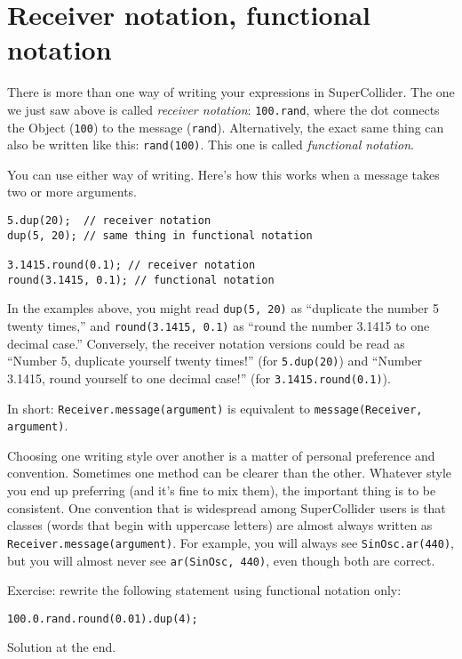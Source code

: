 \section{Receiver notation, functional notation}

There is more than one way of writing your expressions in SuperCollider. The one we just saw above is called \emph{receiver notation}: \texttt{100.rand}, where the dot connects the Object (\texttt{100}) to the message (\texttt{rand}). Alternatively, the exact same thing can also be written like this: \texttt{rand(100)}. This one is called \emph{functional notation}.

You can use either way of writing. Here's how this works when a message takes two or more arguments.

 
\begin{lstlisting}[style=SuperCollider-IDE, basicstyle=\scttfamily\footnotesize]
5.dup(20);  // receiver notation
dup(5, 20); // same thing in functional notation

3.1415.round(0.1); // receiver notation
round(3.1415, 0.1); // functional notation
\end{lstlisting}
 

In the examples above, you might read \texttt{dup(5, 20)} as ``duplicate the number 5 twenty times,'' and \texttt{round(3.1415, 0.1)} as ``round the number 3.1415 to one decimal case.'' Conversely, the receiver notation versions could be read as ``Number 5, duplicate yourself twenty times!'' (for \texttt{5.dup(20)}) and ``Number 3.1415, round yourself to one decimal case!'' (for \texttt{3.1415.round(0.1)}).

In short: \texttt{Receiver.message(argument)} is equivalent to \texttt{message(Receiver, argument)}.

Choosing one writing style over another is a matter of personal preference and convention. Sometimes one method can be clearer than the other. Whatever style you end up preferring (and it's fine to mix them), the important thing is to be consistent. One convention that is widespread among SuperCollider users is that classes (words that begin with uppercase letters) are almost always written as \texttt{Receiver.message(argument)}. For example, you will always see \texttt{SinOsc.ar(440)}, but you will almost never see \texttt{ar(SinOsc, 440)}, even though both are correct.

Exercise: rewrite the following statement using functional notation only:

\texttt{100.0.rand.round(0.01).dup(4);} 

Solution at the end.